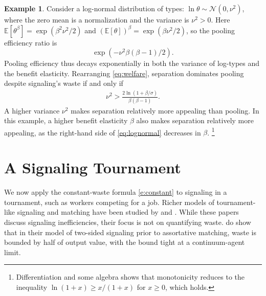 \documentclass[12 pt]{article}
\theoremstyle{remark}
\theoremstyle{definition}
\newtheorem{example}{Example}
\newcommand{\E}{\mathbb{E}}
\let\oldfootnote\footnote
\renewcommand\footnote[1]{\oldfootnote{\hspace{.5mm}#1}}
\begin{document}
\begin{example}
Consider a log-normal distribution of types: $\ln\theta \sim \mathcal N (0, \nu^2)$, where the zero mean is a normalization and the variance is $\nu^2>0$.  Here $
\E[\theta^\beta]=\exp\left(\beta^2 \nu^2 / 2\right)$ and $
(\E[\theta])^\beta=\exp\left({\beta \nu^2 / 2}\right)$, so the pooling efficiency ratio is $$\exp(-\nu^2\beta(\beta-1)/2).$$ Pooling efficiency thus decays exponentially in both the variance of log-types and the benefit elasticity. Rearranging \eqref{eq:welfare}, separation dominates pooling despite signaling's waste if and only if
\begin{align} 
\label{eq:lognormal}
\nu^2 > \frac{2\ln\left(1 + {\beta}/{\sigma}\right)}{\beta(\beta-1)}.
\end{align}
A higher variance $\nu^2$ makes separation relatively more appealing than pooling. %
In this example, a higher benefit elasticity $\beta$ also makes separation relatively more appealing, as the right-hand side of \eqref{eq:lognormal} decreases in $\beta$.%
\footnote{Differentiation and some algebra shows that monotonicity reduces to the inequality $\ln (1+x) \geq x /(1+x)$ for $x \geq 0$, which holds.}
\end{example}

\section{A Signaling Tournament}
\label{sec:tournament}

We now apply the constant-waste formula \eqref{e:constant} to signaling in a tournament, such as workers competing for a job. Richer models of tournament-like signaling and matching have been studied by \citet{HoppeMoldovanuSela09} and \citet{Hopkins12}. %
While these papers discuss signaling inefficiencies, their focus is not on quantifying waste. \citet*{HoppeMoldovanuSela09} do show that in their model of two-sided signaling prior to assortative matching, waste is bounded by half of output value, with the bound tight at a continuum-agent limit.
\end{document}
